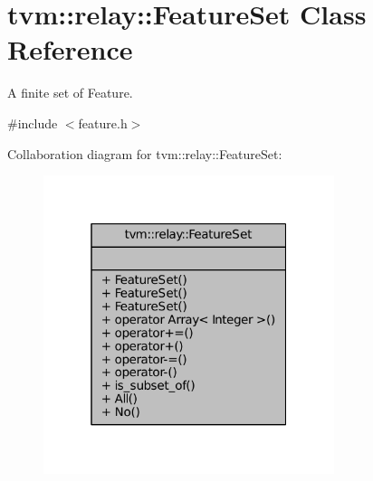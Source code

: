 \hypertarget{classtvm_1_1relay_1_1FeatureSet}{}\section{tvm\+:\+:relay\+:\+:Feature\+Set Class Reference}
\label{classtvm_1_1relay_1_1FeatureSet}


A finite set of Feature.  




{\ttfamily \#include $<$feature.\+h$>$}



Collaboration diagram for tvm\+:\+:relay\+:\+:Feature\+Set\+:
\nopagebreak
\begin{figure}[H]
\begin{center}
\leavevmode
\includegraphics[width=241pt]{classtvm_1_1relay_1_1FeatureSet__coll__graph}
\end{center}
\end{figure}
